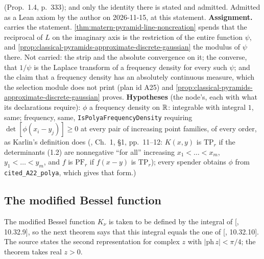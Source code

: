 \begin{theorem}
{(Prop.~1.4, p.~333); and only the identity there is stated and
admitted. Admitted as a Lean axiom by the author on 2026-11-15, at this statement.
\textbf{Assignment.}  carries the statement.
\ref{thm:matern-pyramid-line-noncreation} spends that the reciprocal of $L$ on the imaginary axis
is the restriction of the entire function $\psi$, and
\ref{prop:classical-pyramids-approximate-discrete-gaussian} the modulus of $\psi$ there. Not
carried: the strip and the absolute convergence on it; the converse, that $1/\psi$ is the Laplace transform of a \Polya{}
frequency density for every such $\psi$; and the claim that a \Polya{} frequency density has an
absolutely continuous \Levy{} measure, which the selection module does not print (plan id A25) and
\ref{prop:classical-pyramids-approximate-discrete-gaussian} proves.
\textbf{Hypotheses} (the node's, each with what its declarations require): $\phi$ a \Polya{} frequency
density on $\mathbb{R}$: integrable with integral $1$, same; \Polya{} frequency, same,
\texttt{IsPolyaFrequencyDensity} requiring $\det[\phi(x_i - y_j)] \ge 0$ at every pair of increasing
point families, of every order, as Karlin's definition does (, Ch.~1,
\S1, pp.~11--12: $K(x, y)$ is $\mathrm{TP}_r$ if the determinants (1.2) are nonnegative ``for
all'' increasing $x_1 < \dots < x_m$, $y_1 < \dots < y_m$, and $f$ is $\mathrm{PF}_r$ if
$f(x - y)$ is $\mathrm{TP}_r$); every spender obtains $\phi$ from \texttt{cited\_A22\_polya},
which gives that form.)}
\end{theorem}

\subsection{The modified Bessel function}
\label{subsec:cited-bessel}

The modified Bessel function $K_\nu$ is taken to be defined by the integral of
[, 10.32.9], so the next theorem says that this integral equals the one of
[, 10.32.10]. The source states the second representation for complex $z$ with
$|\mathrm{ph}\,z| < \pi/4$; the theorem takes real $z > 0$.

